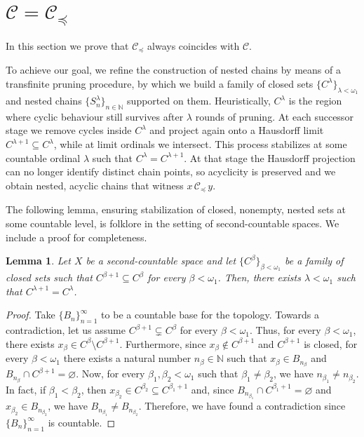 \documentclass[10pt,a4paper]{article}
\theoremstyle{definition}
\theoremstyle{remark}
\theoremstyle{plain}
\newtheorem{lem}[defi]{Lemma}
\begin{document}
\section{\texorpdfstring{$\mathcal{C}=\mathcal{C}_\preceq$}{C = C-preceq}}\label{sec5}

In this section we prove that $\mathcal{C}_\preceq$ always coincides with $\mathcal{C}$. 

To achieve our goal, we refine the construction of nested chains by means of a
transfinite pruning procedure, by which we build a family of closed sets
$\{C^\lambda\}_{\lambda<\omega_1}$ and nested chains
$\{S_n^\lambda\}_{n\in\mathbb{N}}$ supported on them. Heuristically, $C^\lambda$ is the region
where cyclic behaviour still survives after $\lambda$ rounds of pruning.
At each successor stage we remove cycles inside $C^\lambda$ and project again
onto a Hausdorff limit $C^{\lambda+1}\subseteq C^\lambda$, while at limit
ordinals we intersect. This process stabilizes at some countable ordinal
$\lambda$ such that $C^\lambda=C^{\lambda+1}$. At that stage the Hausdorff projection
can no longer identify distinct chain points, so acyclicity is preserved and we
obtain nested, acyclic chains that witness $x\,\mathcal{C}_\preceq\,y$.

The following lemma, ensuring stabilization of closed, nonempty, nested sets
at some countable level, is folklore in the setting of second-countable
spaces. We include a proof for completeness.

\begin{lem}\label{seq.nested.clo.sets.}
    Let $X$ be a second-countable space and let $\{C^\beta\}_{\beta<\omega_1}$ be a family of closed sets such that $C^{\beta+1}\subseteq C^\beta$ for every $\beta<\omega_1$. Then, there exists $\lambda<\omega_1$ such that $C^{\lambda+1}=C^\lambda$.
\end{lem}
\begin{proof}
    Take $\{B_n\}_{n=1}^\infty$ to be a countable base for the topology. Towards a contradiction, let us assume $C^{\beta+1}\subsetneq C^\beta$ for every $\beta<\omega_1$. Thus, for every $\beta<\omega_1$, there exists $x_\beta\in C^\beta\setminus C^{\beta+1}$. Furthermore, since $x_\beta\notin C^{\beta+1}$ and $C^{\beta+1}$ is closed, for every $\beta<\omega_1$ there exists a natural number $n_\beta\in\mathbb{N}$ such that $x_\beta\in B_{n_\beta}$ and $B_{n_\beta}\cap C^{\beta+1}=\varnothing$. Now, for every $\beta_1,\beta_2<\omega_1$ such that $\beta_1\neq\beta_2$, we have $n_{\beta_1}\neq n_{\beta_2}$. In fact, if $\beta_1<\beta_2$, then $x_{\beta_2}\in C^{\beta_2}\subseteq C^{\beta_1+1}$ and, since $B_{n_{\beta_1}}\cap C^{\beta_1+1}=\varnothing$ and $x_{\beta_2}\in B_{n_{\beta_2}}$, we have $B_{n_{\beta_1}}\neq B_{n_{\beta_2}}$. Therefore, we have found a contradiction since $\{B_n\}_{n=1}^\infty$ is countable.
\end{proof}
\end{document}
